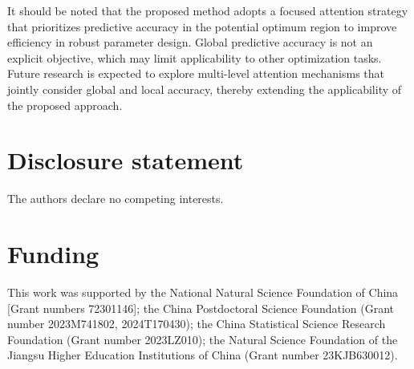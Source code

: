 \documentclass[]{interact}
\theoremstyle{plain}%
\theoremstyle{definition}
\theoremstyle{remark}
\begin{document}
It should be noted that the proposed method adopts a focused attention strategy that prioritizes predictive accuracy in the potential optimum region to improve efficiency in robust parameter design. Global predictive accuracy is not an explicit objective, which may limit applicability to other optimization tasks. Future research is expected to explore multi-level attention mechanisms that jointly consider global and local accuracy, thereby extending the applicability of the proposed approach.



\section*{Disclosure statement}

The authors declare no competing interests.


\section*{Funding}

This work was supported by the National Natural Science Foundation of China [Grant numbers 72301146]; the China Postdoctoral Science Foundation (Grant number 2023M741802, 2024T170430); the China Statistical Science Research Foundation (Grant number 2023LZ010); the Natural Science Foundation of the Jiangsu Higher Education Institutions of China (Grant number 23KJB630012).
\end{document}
